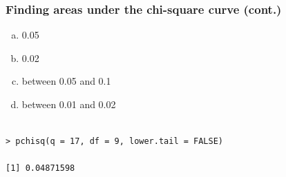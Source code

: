 
\begin{frame}[fragile]
\frametitle{Finding areas under the chi-square curve (cont.)}


{
{\small
\begin{enumerate}[(a)]
\setlength{\itemsep}{0in}
\item 0.05
\item 0.02
\item between 0.05 and 0.1
\item between 0.01 and 0.02
\end{enumerate}
}
}

\pause

\begin{verbatim}

> pchisq(q = 17, df = 9, lower.tail = FALSE)

[1] 0.04871598

\end{verbatim}

\end{frame}


